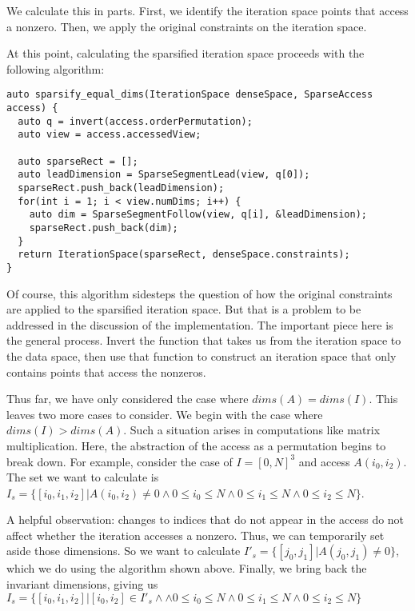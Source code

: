 We calculate this in parts. 
First, we identify the iteration space points that access a nonzero. 
Then, we apply the original constraints on the iteration space. 

At this point, calculating the sparsified iteration space proceeds with the following algorithm:
\begin{lstlisting}
auto sparsify_equal_dims(IterationSpace denseSpace, SparseAccess access) {
  auto q = invert(access.orderPermutation);
  auto view = access.accessedView;
  
  auto sparseRect = [];
  auto leadDimension = SparseSegmentLead(view, q[0]);
  sparseRect.push_back(leadDimension);
  for(int i = 1; i < view.numDims; i++) {
    auto dim = SparseSegmentFollow(view, q[i], &leadDimension);
    sparseRect.push_back(dim);
  }
  return IterationSpace(sparseRect, denseSpace.constraints);
}
\end{lstlisting}
Of course, this algorithm sidesteps the question of how the original constraints are applied to the sparsified iteration space.
But that is a problem to be addressed in the discussion of the implementation.
The important piece here is the general process. 
Invert the function that takes us from the iteration space to the data space, then use that function to construct an iteration space that only contains points that access the nonzeros.

Thus far, we have only considered the case where $dims(A) = dims(I)$.
This leaves two more cases to consider. 
We begin with the case where $dims(I) > dims(A)$. 
Such a situation arises in computations like matrix multiplication.
Here, the abstraction of the access as a permutation begins to break down. 
For example, consider the case of $I=[0,N]^3$ and access $A(i_0,i_2)$.
The set we want to calculate is $I_s = \{[i_0,i_1,i_2] | A(i_0,i_2) \neq 0 \land 0 \leq i_0 \leq N \land 0 \leq i_1 \leq N \land 0 \leq i_2 \leq N\}$.

A helpful observation: changes to indices that do not appear in the access do not affect whether the iteration accesses a nonzero.
Thus, we can temporarily set aside those dimensions.
So we want to calculate $I\prime_s = \{[j_0,j_1] | A(j_0,j_1) \neq 0\}$, which we do using the algorithm shown above.
Finally, we bring back the invariant dimensions, giving us $I_s = \{[i_0,i_1,i_2] | [i_0,i_2] \in I\prime_s \land \land 0 \leq i_0 \leq N \land 0 \leq i_1 \leq N \land 0 \leq i_2 \leq N\}$


